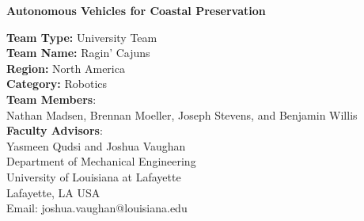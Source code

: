\documentclass[12 pt]{article}
\begin{document}
\begin{center}
{\LARGE \bf Autonomous Vehicles for Coastal Preservation}

\textbf{Team Type:} University Team\\
\textbf{Team Name:} Ragin' Cajuns\\
\textbf{Region:} North America\\
\textbf{Category:} Robotics\\
\vspace{0.1in}
\textbf{Team Members}:\\Nathan Madsen, Brennan Moeller, Joseph Stevens, and Benjamin Willis\\
\vspace{0.1in}
\textbf{Faculty Advisors}:\\Yasmeen Qudsi and Joshua Vaughan \\

\vspace{0.1in}
\footnotesize{Department of Mechanical Engineering\\
University of Louisiana at Lafayette\\
Lafayette, LA USA\\
Email: joshua.vaughan@louisiana.edu}
\end{center}



\pagestyle{plain}
\cfoot{\thepage}

\begin{abstract}
\vspace{-0.2in}
The work proposed here seeks to improve the safety and efficiency of autonomous surface vessels used to monitor wetlands through the addition of an OAK-D camera. The OAK-D would increase the efficiency of the autonomous system by reducing the computational load on the on-board computers, thereby increasing the computational power available for both the scientific mission on the boat and the inclusion of additional peripherals to enhance safety. This addition would also help improve the localization precision the surface vessel by enabling more sensors, such as LiDAR, to be added with the same computational resources and power requirements. The overall system would be able to achieve safer and more efficient coastal monitoring with the addition of an OAK-D camera. 
\end{abstract}
\end{document}
